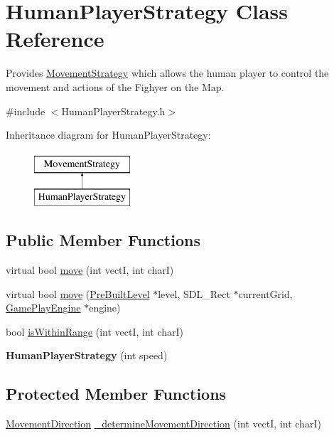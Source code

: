 \hypertarget{class_human_player_strategy}{}\section{Human\+Player\+Strategy Class Reference}
\label{class_human_player_strategy}


Provides \hyperlink{class_movement_strategy}{Movement\+Strategy} which allows the human player to control the movement and actions of the Fighyer on the Map.  




{\ttfamily \#include $<$Human\+Player\+Strategy.\+h$>$}

Inheritance diagram for Human\+Player\+Strategy\+:\begin{figure}[H]
\begin{center}
\leavevmode
\includegraphics[height=2.000000cm]{class_human_player_strategy}
\end{center}
\end{figure}
\subsection*{Public Member Functions}
\begin{DoxyCompactItemize}
\item 
virtual bool \hyperlink{class_human_player_strategy_ab798317a51caba9ada8e5bd2f9a5bd13}{move} (int vectI, int charI)
\item 
virtual bool \hyperlink{class_human_player_strategy_a13ea61ac71164220e3f01b0c5459acfe}{move} (\hyperlink{class_pre_built_level}{Pre\+Built\+Level} $\ast$level, S\+D\+L\+\_\+\+Rect $\ast$current\+Grid, \hyperlink{class_game_play_engine}{Game\+Play\+Engine} $\ast$engine)
\item 
bool \hyperlink{class_human_player_strategy_ab5648cac493c1f34a7e48b3e98dbf0fc}{is\+Within\+Range} (int vectI, int charI)
\item 
\hypertarget{class_human_player_strategy_acf97480ec1fe5808f8483ef775d5909e}{}\label{class_human_player_strategy_acf97480ec1fe5808f8483ef775d5909e} 
{\bfseries Human\+Player\+Strategy} (int speed)
\end{DoxyCompactItemize}
\subsection*{Protected Member Functions}
\begin{DoxyCompactItemize}
\item 
\hyperlink{_movement_strategy_8h_a0b5e764f0ec9a407e9b8789f0259d754}{Movement\+Direction} \hyperlink{class_human_player_strategy_aa1087e1c03873119655e0df3a325cc27}{\+\_\+determine\+Movement\+Direction} (int vectI, int charI)
\end{DoxyCompactItemize}
